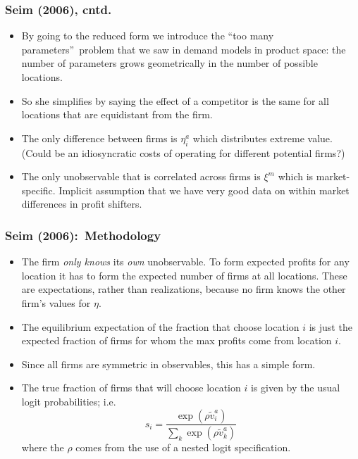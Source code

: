 \documentclass[xcolor=pdftex,dvipsnames,table,mathserif]{beamer}
\begin{document}
\begin{frame}
\frametitle{Seim (2006), cntd.}
\footnotesize
\begin{itemize}
\item By going to the reduced form we introduce the \textquotedblleft too
many parameters\textquotedblright\ problem that we saw in demand models in
product space: the number of parameters grows geometrically in the number of
possible locations.

\item So she simplifies by saying the effect of a competitor is the same for
all locations that are equidistant from the firm.

\item The only difference between firms is $\eta _{i}^{a}$ which distributes
extreme value. (Could be an idiosyncratic costs of operating for different
potential firms?)

\item The only unobservable that is correlated across firms is $\xi ^{m}$
which is market-specific. Implicit assumption that we have very good data on
within market differences in profit shifters.
\end{itemize}
\end{frame}

\begin{frame}
\frametitle{Seim (2006):\ Methodology}

\footnotesize
\begin{itemize}
\item The firm \textit{only knows} its \textit{own} unobservable. To form
expected profits for any location it has to form the expected number of
firms at all locations. These are expectations, rather than realizations,
because no firm knows the other firm's values for $\eta $.
\item The equilibrium expectation of the fraction that choose location $i$
is just the expected fraction of firms for whom the max profits come from
location $i.$
\item Since all firms are symmetric in observables, this has a simple form.
\item The true fraction of firms that will choose location $i$ is given by
the usual logit probabilities; i.e. 
\begin{equation*}
s_{i}=\frac{\exp (\rho \tilde{v}_{i}^{a})}{\sum_{k}\exp (\rho \tilde{v}%
_{k}^{a})}
\end{equation*}
where the $\rho $ comes from the use of a nested logit specification.
\end{itemize}
\end{frame}
\end{document}
